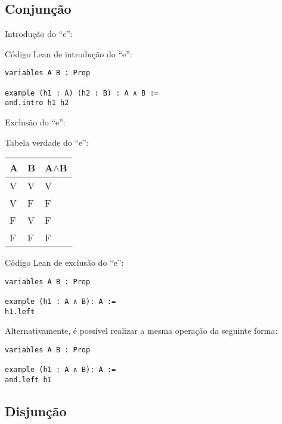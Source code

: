 \subsection{Conjunção}

Introdução do ``e'':
 \begin{prooftree}
\end{prooftree}



Código Lean de introdução do ``e'':
\begin{lstlisting} 
variables A B : Prop

example (h1 : A) (h2 : B) : A ∧ B :=
and.intro h1 h2
\end{lstlisting}


Exclusão do ``e'':
 \begin{prooftree}
\end{prooftree}

Tabela verdade do ``e'':
\begin{table}[htb]
\begin{tabular}{|l|l|l|}
\hline
\textbf{A} & \textbf{B} & \textbf{A$\land$B} \\ \hline
V          & V          & V                  \\ \hline
V          & F          & F                  \\ \hline
F          & V          & F                  \\ \hline
F          & F          & F                  \\ \hline
\end{tabular}
\end{table}

Código Lean de exclusão do ``e'': 
\begin{lstlisting} 
variables A B : Prop

example (h1 : A ∧ B): A :=
h1.left
\end{lstlisting}

Alternativamente, é possível realizar a mesma operação da seguinte forma: 
\begin{lstlisting} 
variables A B : Prop

example (h1 : A ∧ B): A :=
and.left h1
\end{lstlisting}
\subsection{Disjunção}

